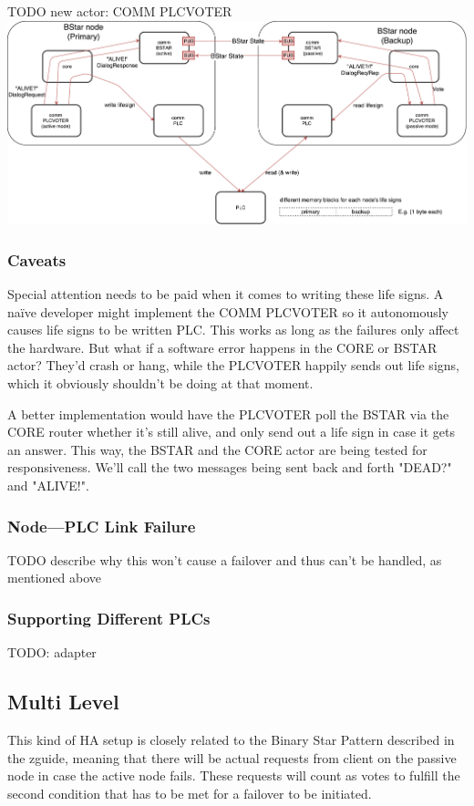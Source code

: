 TODO new actor: COMM PLCVOTER\\

\includegraphics[width=\textwidth]{img/SL-HA_bstar.pdf}

\subsubsection{Caveats}
Special attention needs to be paid when it comes to writing these life signs. A
na\"ive developer might implement the COMM PLCVOTER so it autonomously causes
life signs to be written PLC. This works as long as the failures only affect
the hardware. But what if a software error happens in the CORE or BSTAR actor?
They'd crash or hang, while the PLCVOTER happily sends out life signs, which it
obviously shouldn't be doing at that moment.

A better implementation would have the PLCVOTER poll the BSTAR via the CORE
router whether it's still alive, and only send out a life sign in case it gets
an answer. This way, the BSTAR and the CORE actor are being tested for
responsiveness. We'll call the two messages being sent back and forth "DEAD?"
and "ALIVE!".

\subsubsection{Node---PLC Link Failure}
TODO describe why this won't cause a failover and thus can't be handled, as
mentioned above\\

\subsubsection{Supporting Different PLCs}
TODO: adapter

\subsection{Multi Level}
This kind of HA setup is closely related to the Binary Star Pattern described
in the zguide, meaning that there will be actual requests from client on the
passive node in case the active node fails. These requests will count as votes
to fulfill the second condition that has to be met for a failover to be
initiated.

